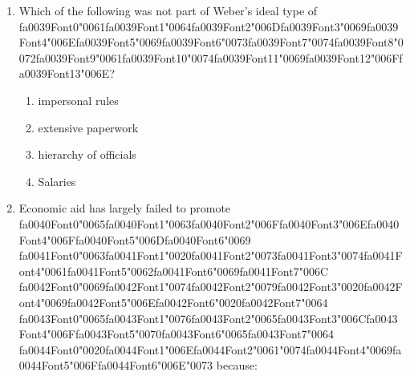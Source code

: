 \documentclass[12pt]{article}
\begin{document}
\begin{enumerate}[label=\arabic*.]
\begin{enumerate}[label=(\alph*)]
    \item they have a deep-rooted sense of ineffectiveness and are striving for control
    \item they are in pursuit of the 'perfect' body, fuelled by images of beauty
    \item they perceive a part of their body as stigmatizing, in relation to a cultural ideal
    \item their male partners pressurize them to look like supermodels
\end{enumerate}
\item Which of the following was not part of Weber's ideal type of {\csname fa0039Font0\endcsname\char"0061}{\csname fa0039Font1\endcsname\char"0064}{\csname fa0039Font2\endcsname\char"006D}{\csname fa0039Font3\endcsname\char"0069}{\csname fa0039Font4\endcsname\char"006E}{\csname fa0039Font5\endcsname\char"0069}{\csname fa0039Font6\endcsname\char"0073}{\csname fa0039Font7\endcsname\char"0074}{\csname fa0039Font8\endcsname\char"0072}{\csname fa0039Font9\endcsname\char"0061}{\csname fa0039Font10\endcsname\char"0074}{\csname fa0039Font11\endcsname\char"0069}{\csname fa0039Font12\endcsname\char"006F}{\csname fa0039Font13\endcsname\char"006E}?
\begin{enumerate}[label=(\alph*)]
    \item impersonal rules
    \item extensive paperwork
    \item hierarchy of officials
    \item Salaries
\end{enumerate}
\item Economic aid has largely failed to promote {\csname fa0040Font0\endcsname\char"0065}{\csname fa0040Font1\endcsname\char"0063}{\csname fa0040Font2\endcsname\char"006F}{\csname fa0040Font3\endcsname\char"006E}{\csname fa0040Font4\endcsname\char"006F}{\csname fa0040Font5\endcsname\char"006D}{\csname fa0040Font6\endcsname\char"0069} {\csname fa0041Font0\endcsname\char"0063}{\csname fa0041Font1\endcsname\char"0020}{\csname fa0041Font2\endcsname\char"0073}{\csname fa0041Font3\endcsname\char"0074}{\csname fa0041Font4\endcsname\char"0061}{\csname fa0041Font5\endcsname\char"0062}{\csname fa0041Font6\endcsname\char"0069}{\csname fa0041Font7\endcsname\char"006C} {\csname fa0042Font0\endcsname\char"0069}{\csname fa0042Font1\endcsname\char"0074}{\csname fa0042Font2\endcsname\char"0079}{\csname fa0042Font3\endcsname\char"0020}{\csname fa0042Font4\endcsname\char"0069}{\csname fa0042Font5\endcsname\char"006E}{\csname fa0042Font6\endcsname\char"0020}{\csname fa0042Font7\endcsname\char"0064} {\csname fa0043Font0\endcsname\char"0065}{\csname fa0043Font1\endcsname\char"0076}{\csname fa0043Font2\endcsname\char"0065}{\csname fa0043Font3\endcsname\char"006C}{\csname fa0043Font4\endcsname\char"006F}{\csname fa0043Font5\endcsname\char"0070}{\csname fa0043Font6\endcsname\char"0065}{\csname fa0043Font7\endcsname\char"0064} {\csname fa0044Font0\endcsname\char"0020}{\csname fa0044Font1\endcsname\char"006E}{\csname fa0044Font2\endcsname\char"0061}{\char"0074}{\csname fa0044Font4\endcsname\char"0069}{\csname fa0044Font5\endcsname\char"006F}{\csname fa0044Font6\endcsname\char"006E}{\char"0073} because:

\end{enumerate}
\end{document}
